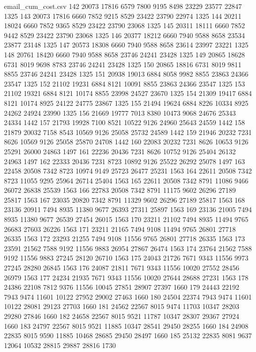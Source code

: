 \begin{filecontents*}{email_cum_cost.csv}
142	20073	17816	6579	7800	9195	8498	23229	23577	22847	1325
143	20073	17816	6660	7852	9215	8529	23422	23790	22974	1325
144	20211	18024	6660	7852	9365	8529	23422	23790	23068	1325
145	20311	18111	6660	7852	9442	8529	23422	23790	23068	1325
146	20377	18212	6660	7940	9588	8658	23534	23877	23148	1325
147	20573	18308	6660	7940	9588	8658	23614	23997	23221	1325
148	20761	18420	6660	7940	9588	8658	23746	24241	23428	1325
149	20865	18628	6731	8019	9698	8783	23746	24241	23428	1325
150	20865	18816	6731	8019	9811	8855	23746	24241	23428	1325
151	20938	19013	6884	8058	9982	8855	23863	24366	23547	1325
152	21102	19231	6884	8121	10091	8855	23863	24366	23547	1325
153	21102	19321	6884	8121	10174	8855	23998	24527	23670	1325
154	21309	19417	6884	8121	10174	8925	24122	24775	23867	1325
155	21494	19624	6884	8226	10334	8925	24262	24924	23990	1325
156	21669	19777	7013	8380	10473	9068	24676	25343	24334	1442
157	21793	19928	7100	8521	10522	9126	24960	25643	24559	1442
158	21879	20032	7158	8543	10569	9126	25058	25732	24589	1442
159	21946	20232	7231	8626	10569	9126	25058	25870	24708	1442
160	22083	20232	7231	8626	10653	9126	25291	26000	24863	1497
161	22236	20436	7231	8626	10752	9126	25404	26132	24963	1497
162	22333	20436	7231	8723	10892	9126	25522	26292	25078	1497
163	22458	20508	7342	8723	10974	9149	25723	26477	25231	1563
164	22611	20508	7342	8723	11055	9295	25964	26714	25404	1563
165	22611	20508	7342	8791	11086	9466	26072	26838	25539	1563
166	22783	20508	7342	8791	11175	9602	26296	27189	25817	1563
167	23035	20820	7342	8791	11329	9602	26296	27189	25817	1563
168	23136	20911	7494	8935	11380	9677	26393	27311	25897	1563
169	23136	21005	7494	8935	11380	9677	26539	27454	26015	1563
170	23211	21102	7494	8935	11494	9765	26683	27603	26226	1563
171	23211	21165	7494	9108	11494	9765	26801	27718	26335	1563
172	23293	21255	7494	9108	11556	9765	26801	27718	26335	1563
173	23591	21562	7588	9192	11556	9883	26954	27867	26474	1563
174	23764	21562	7588	9192	11556	9883	27245	28120	26710	1563
175	24043	21726	7671	9343	11556	9973	27245	28280	26845	1563
176	24087	21811	7671	9343	11556	10020	27552	28456	26979	1563
177	24234	21935	7671	9343	11556	10020	27644	28688	27231	1563
178	24386	22108	7812	9376	11556	10045	27851	28907	27397	1660
179	24443	22192	7943	9474	11601	10122	27952	29002	27463	1660
180	24504	22374	7943	9474	11601	10122	28081	29123	27703	1660
181	24562	22567	8015	9474	11703	10347	28203	29280	27846	1660
182	24658	22567	8015	9521	11787	10347	28307	29367	27924	1660
183	24797	22567	8015	9521	11885	10347	28541	29450	28255	1660
184	24908	22835	8015	9590	11885	10468	28685	29450	28497	1660
185	25132	22835	8081	9637	12064	10532	28815	29887	28816	1730

\end{filecontents*}
